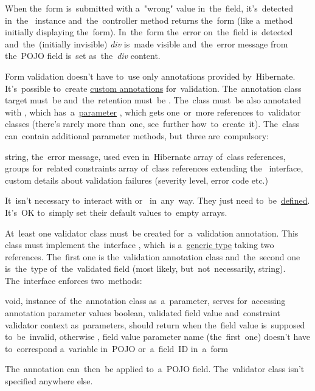 \noindent When the~form is~submitted with a~"wrong" value in~the~field, it's~detected in~the~ instance and~the~controller method returns the~form (like a~method initially displaying the~form).
In~the~form the~error on~the~field is~detected and~the~(initially invisible) \textit{div} is~made visible and~the~error message from the~POJO field is~set as~the~\textit{div} content.

Form validation doesn't have to~use only annotations provided by~Hibernate.
It's~possible to~create \hyperref[javacustomannotations]{custom annotations} for~validation.
The~annotation class target must~be  and~the~retention must~be .
The~class must~be also annotated with , which has~a~\hyperref[parameterargument]{parameter} , which gets one~or~more references to~validator classes (there's rarely more than~one, see~further how~to~create~it).
The~class can~contain additional parameter methods, but~three are~compulsory:
\begin{itemize}
     string, the~error message, used even in~Hibernate
     array of~class references, groups for~related constraints
     array of~class references extending the~ interface, custom details about validation failures (severity level, error code etc.)
\end{itemize}
\noindent It~isn't necessary to~interact with  or~ in~any~way.
They just need to~be~\hyperref[declarationdefinition]{defined}.
It's~OK to~simply set their default values to~empty arrays.

At~least one validator class must~be created for~a~validation annotation.
This class must implement the~interface , which~is a~\hyperref[javagenerics]{generic type} taking two references.
The~first one is the~validation annotation class and~the~second one is~the~type of~the~validated field (most likely, but~not~necessarily, string).
The~interface enforces two~methods:
\begin{itemize}
     void, instance of~the~annotation class as~a~parameter, serves for~accessing annotation parameter values
     boolean, validated field value and~constraint validator context as~parameters, should return  when the~field value is~supposed to~be~invalid, otherwise , field value parameter name (the~first~one) doesn't have to~correspond a~variable in~POJO or~a~field~ID in~a~form
\end{itemize}
The~annotation can~then~be applied to~a~POJO field.
The~validator class isn't specified anywhere else.
\newpage

